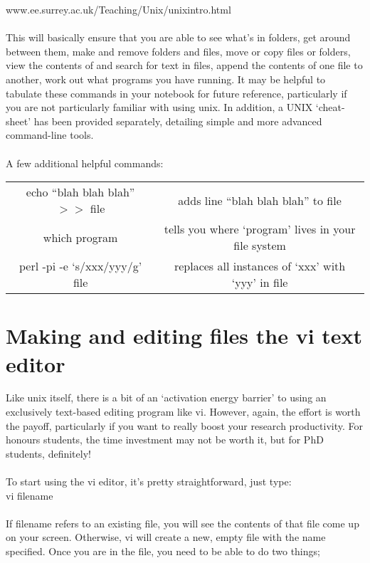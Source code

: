 \documentclass{article}
\begin{document}
www.ee.surrey.ac.uk/Teaching/Unix/unixintro.html\\
\\
\noindent
This will basically ensure that you are able to see what's in folders, get around between them, make and remove folders and files, move or copy files or folders, view the contents of and search for text in files, append the contents of one file to another, work out what programs you have running. It may be helpful to tabulate these commands in your notebook for future reference, particularly if you are not particularly familiar with using unix. In addition, a UNIX `cheat-sheet' has been provided separately, detailing simple and more advanced command-line tools.\\
\\
\noindent
A few additional helpful commands:
\begin{table}[htdp]
\begin{center}
\begin{tabular}{|c|c|}
\hline
echo ``blah blah blah'' $>>$ file	& 	adds line ``blah blah blah'' to file	\\
which program				& 	tells you where `program' lives in your file system \\
perl -pi -e `s/xxx/yyy/g' file		& 	replaces all instances of `xxx' with `yyy' in file	\\
\hline
\end{tabular}
\end{center}
\label{default}
\end{table}%

\section{Making and editing files the vi text editor}

Like unix itself, there is a bit of an `activation energy barrier' to using an exclusively text-based editing program like vi. However, again, the effort is worth the payoff, particularly if you want to really boost your research productivity. For honours students, the time investment may not be worth it, but for PhD students, definitely!\\
\\
\noindent
To start using the vi editor, it's pretty straightforward, just type:\\

vi filename\\
\\
\noindent
If filename refers to an existing file, you will see the contents of that file come up on your screen. Otherwise, vi will create a new, empty file with the name specified. Once you are in the file, you need to be able to do two things; 
\end{document}
